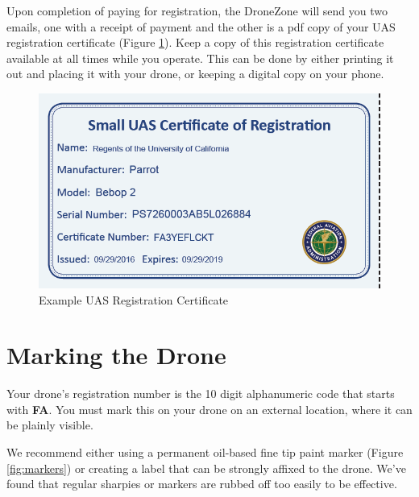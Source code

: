 \documentclass[
]{book}
\begin{document}
Upon completion of paying for registration, the DroneZone will send you two emails, one with a receipt of payment and the other is a pdf copy of your UAS registration certificate (Figure \ref{fig:reg-cert}). Keep a copy of this registration certificate available at all times while you operate. This can be done by either printing it out and placing it with your drone, or keeping a digital copy on your phone.

\begin{figure}

{\centering \includegraphics[width=0.5\linewidth]{images/reg_cert} 

}

\caption{Example UAS Registration Certificate}\label{fig:reg-cert}
\end{figure}

\hypertarget{marking-the-drone}{%
\section{Marking the Drone}\label{marking-the-drone}}

Your drone's registration number is the 10 digit alphanumeric code that starts with \textbf{FA}. You must mark this on your drone on an external location, where it can be plainly visible.

We recommend either using a permanent oil-based fine tip paint marker (Figure \ref{fig:markers}) or creating a label that can be strongly affixed to the drone. We've found that regular sharpies or markers are rubbed off too easily to be effective.
\end{document}
